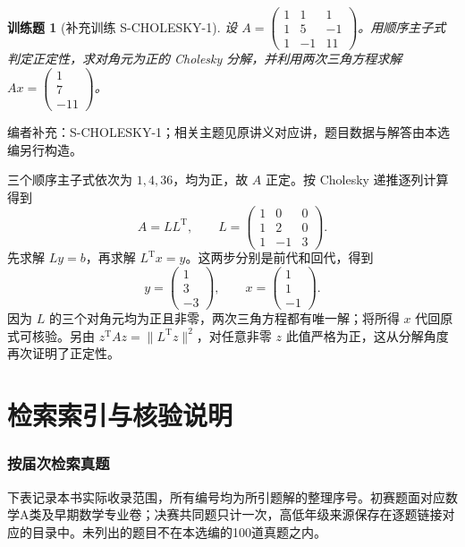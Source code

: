 \documentclass[UTF8,12pt,a4paper,fontset=fandol]{ctexart}
\newtheorem{exercise}{训练题}[section]
\begin{document}
\begin{exercise}[补充训练 S-CHOLESKY-1]\label{prob:S-CHOLESKY-1}
设 $A=\begin{pmatrix}1&1&1\\1&5&-1\\1&-1&11\end{pmatrix}$。用顺序主子式判定正定性，求对角元为正的 Cholesky 分解，并利用两次三角方程求解 $Ax=\begin{pmatrix}1\\7\\-11\end{pmatrix}$。
\end{exercise}
\noindent 编者补充：S-CHOLESKY-1；相关主题见原讲义对应讲，题目数据与解答由本选编另行构造。
\begin{solve}
三个顺序主子式依次为 $1,4,36$，均为正，故 $A$ 正定。按 Cholesky 递推逐列计算得到
\[A=LL^{\mathrm T},\qquad L=\begin{pmatrix}1&0&0\\1&2&0\\1&-1&3\end{pmatrix}.\]
先求解 $Ly=b$，再求解 $L^{\mathrm T}x=y$。这两步分别是前代和回代，得到
\[y=\begin{pmatrix}1\\3\\-3\end{pmatrix},\qquad x=\begin{pmatrix}1\\1\\-1\end{pmatrix}.\]
因为 $L$ 的三个对角元均为正且非零，两次三角方程都有唯一解；将所得 $x$ 代回原式可核验。另由 $z^{\mathrm T}Az=\|L^{\mathrm T}z\|^2$，对任意非零 $z$ 此值严格为正，这从分解角度再次证明了正定性。
\end{solve}

\part{检索索引与核验说明}

\section{按届次检索真题}\label{sec:sources}

下表记录本书实际收录范围，所有编号均为所引题解的整理序号。初赛题面对应数学A类及早期数学专业卷；决赛共同题只计一次，高低年级来源保存在逐题链接对应的目录中。未列出的题目不在本选编的100道真题之内。
\end{document}
